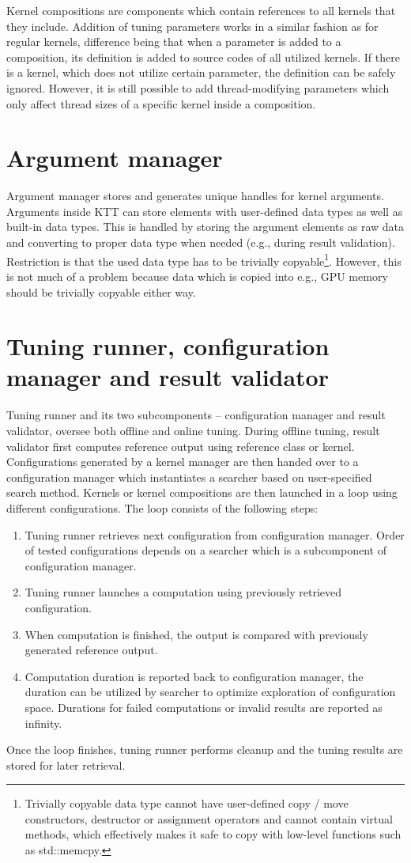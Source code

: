 \documentclass
[
    digital, %
    oneside, %
    table, %
    nolof, %
    nolot, %
    nocover %
]{fithesis3}
\begin{document}
Kernel compositions are components which contain references to all kernels that they include. Addition of tuning parameters works in a similar fashion
as for regular kernels, difference being that when a parameter is added to a composition, its definition is added to source codes of all utilized kernels.
If there is a kernel, which does not utilize certain parameter, the definition can be safely ignored. However, it is still possible to add thread-modifying
parameters which only affect thread sizes of a specific kernel inside a composition.

\section{Argument manager}
Argument manager stores and generates unique handles for kernel arguments. Arguments inside KTT can store elements with user-defined data types as well as
built-in data types. This is handled by storing the argument elements as raw data and converting to proper data type when needed (e.g., during result
validation). Restriction is that the used data type has to be trivially copyable\footnote{Trivially copyable data type cannot have user-defined
copy / move constructors, destructor or assignment operators and cannot contain virtual methods, which effectively makes it safe to copy with low-level
functions such as std::memcpy.}. However, this is not much of a problem because data which is copied into e.g., GPU memory should be trivially copyable
either way.

\section{Tuning runner, configuration manager and result validator}
Tuning runner and its two subcomponents -- configuration manager and result validator, oversee both offline and online tuning. During offline tuning,
result validator first computes reference output using reference class or kernel. Configurations generated by a kernel manager are then handed over to
a configuration manager which instantiates a searcher based on user-specified search method. Kernels or kernel compositions are then launched in a loop
using different configurations. The loop consists of the following steps:
\begin{enumerate}
    \item Tuning runner retrieves next configuration from configuration manager. Order of tested configurations depends on a searcher which is
    a subcomponent of configuration manager.
    \item Tuning runner launches a computation using previously retrieved configuration.
    \item When computation is finished, the output is compared with previously generated reference output.
    \item Computation duration is reported back to configuration manager, the duration can be utilized by searcher to optimize exploration of
    configuration space. Durations for failed computations or invalid results are reported as infinity.
\end{enumerate}
Once the loop finishes, tuning runner performs cleanup and the tuning results are stored for later retrieval.
\end{document}
